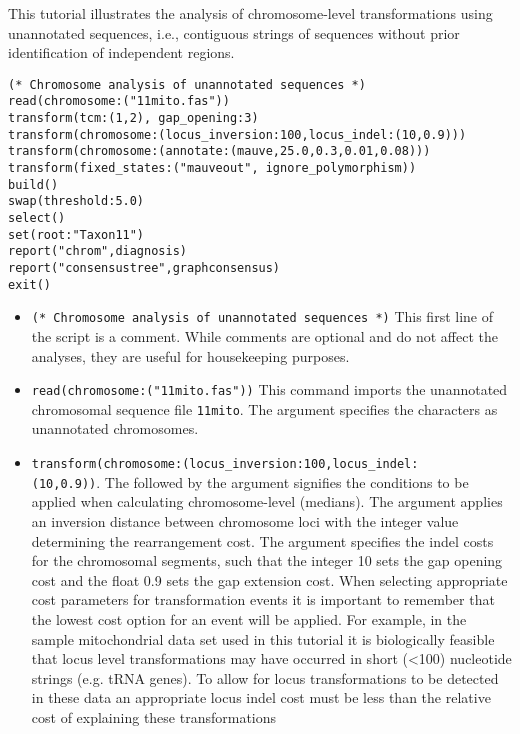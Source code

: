 This tutorial illustrates the analysis of chromosome-level transformations using 
unannotated sequences, i.e., contiguous strings of sequences without prior 
identification of independent regions. 

\begin{verbatim}
(* Chromosome analysis of unannotated sequences *)
read(chromosome:("11mito.fas"))
transform(tcm:(1,2), gap_opening:3)
transform(chromosome:(locus_inversion:100,locus_indel:(10,0.9)))
transform(chromosome:(annotate:(mauve,25.0,0.3,0.01,0.08)))
transform(fixed_states:("mauveout", ignore_polymorphism))
build()
swap(threshold:5.0)
select()
set(root:"Taxon11")
report("chrom",diagnosis)
report("consensustree",graphconsensus)
exit()
\end{verbatim}

\begin{itemize}
\item \texttt{(* Chromosome analysis of unannotated sequences *)} This first line of the script is a comment. While 
comments are optional and do not affect the analyses, they are useful for housekeeping purposes.
\item \texttt{read(chromosome:("11mito.fas"))} This command imports the unannotated chromosomal sequence file 
\texttt{11mito}. The argument  specifies the characters as unannotated chromosomes.
\item \texttt{transform(chromosome:(locus\_inversion:100,locus\_indel:\\(10,0.9))}.  The  
followed by the argument  signifies the conditions to be applied when calculating 
chromosome-level (medians).  The argument  applies an inversion distance 
between chromosome loci with the integer value determining the rearrangement cost. The argument 
 specifies the indel costs for the chromosomal segments, such that the integer 10 
sets the gap opening cost and the float 0.9 sets the gap extension cost.  When selecting appropriate cost parameters
for transformation events it is important to remember that the lowest cost option for an event will be applied. For example,
in the sample mitochondrial data set used in this tutorial it is biologically feasible that locus level transformations may 
have occurred in short (<100) nucleotide strings (e.g. tRNA genes). To allow for locus transformations to be detected
in these data an appropriate locus indel cost must be less than the relative cost of explaining these transformations 

\end{itemize}
